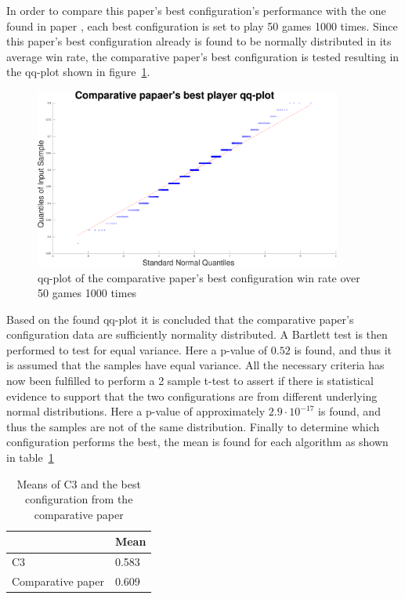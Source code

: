 In order to compare this paper's best configuration's performance with the one found in 
paper \cite{peter},
each best configuration is set to play 50 games 1000 times. 
Since this paper's best configuration already 
is found to be normally distributed in its average win rate, the comparative paper's best 
configuration is tested resulting in the qq-plot shown in figure~\ref{fig:peter-qq-plot}.
\begin{figure}
	\begin{small}
		\begin{center}
			\includegraphics[width=0.9\textwidth]{fig/peter-qq-plot.pdf}
		\end{center}
		\caption{qq-plot of the comparative paper's best configuration win rate over 50 games 1000 times}
		\label{fig:peter-qq-plot}
	\end{small}
\end{figure}
Based on the found qq-plot it is concluded that the comparative paper's configuration 
data are sufficiently normality distributed. A Bartlett test is then performed to test for equal variance. 
Here a p-value of $0.52$ is found, and thus it is assumed that the samples have equal variance. 
All the necessary criteria has now been fulfilled to perform a 2 sample t-test to assert
if there is statistical evidence to support that the two configurations are from different underlying 
normal distributions.
Here a p-value of approximately $ 2.9\cdot 10^{-17}$ is found, 
and thus the samples are not of the same distribution. Finally to determine which configuration 
performs the best, the mean is found for each algorithm as shown in table~\ref{tab:final-result}
\begin{table}[H]
	\begin{center}
		\caption{Means of C3 and the best configuration from the comparative paper}
		\label{tab:final-result}
		\begin{tabular}{|l|l|}
			\hline
			{}					& Mean   \\ \hline
			C3					& 0.583  \\ \hline
			Comparative paper 	& 0.609 \\ \hline
		\end{tabular}
	\end{center}
\end{table}
